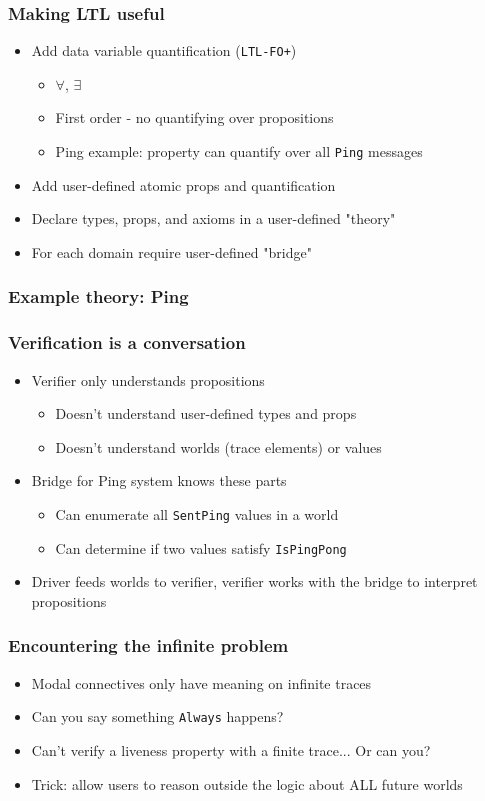 \documentclass[12pt,aspectratio=169]{beamer}
\begin{document}
\begin{frame}
\frametitle{Making LTL useful}
\begin{itemize}
  \item Add data variable quantification (\texttt{LTL-FO+})
  \begin{itemize}
    \item $\forall$, $\exists$
    \item First order - no quantifying over propositions
    \item Ping example: property can quantify over all \texttt{Ping} messages
  \end{itemize}
  \item Add user-defined atomic props and quantification
  \item Declare types, props, and axioms in a user-defined "theory"
  \item For each domain require user-defined "bridge"
\end{itemize}
\end{frame}

\begin{frame}
\frametitle{Example theory: Ping}
  {\fontsize{10}{12}\selectfont
    
  }
\end{frame}

\begin{frame}
\frametitle{Verification is a conversation}
\begin{itemize}
  \item Verifier only understands propositions
  \begin{itemize}
    \item Doesn't understand user-defined types and props
    \item Doesn't understand worlds (trace elements) or values
  \end{itemize}
  \item Bridge for Ping system knows these parts
  \begin{itemize}
    \item Can enumerate all \texttt{SentPing} values in a world
    \item Can determine if two values satisfy \texttt{IsPingPong}
  \end{itemize}
  \item Driver feeds worlds to verifier, verifier works with the bridge to interpret propositions
\end{itemize}
\end{frame}

\begin{frame}
\frametitle{Encountering the infinite problem}
\begin{itemize}
  \item Modal connectives only have meaning on infinite traces
  \item Can you say something \texttt{Always} happens?
  \item Can't verify a liveness property with a finite trace... Or can you?
  \item Trick: allow users to reason outside the logic about ALL future worlds
\end{itemize}
\end{frame}
\end{document}
